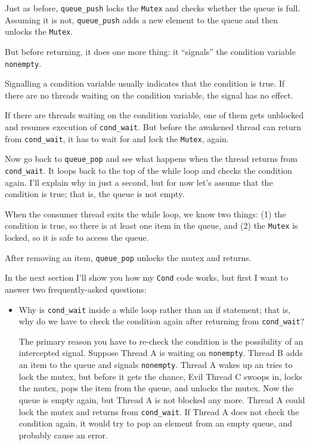 \documentclass[12pt]{book}
\begin{document}
{Just as before, \verb"queue_push" locks the {\tt Mutex} and checks
whether the queue is full.  Assuming it is not, \verb"queue_push" adds
a new element to the queue and then unlocks the {\tt Mutex}.

But before returning, it does one more thing: it ``signals'' the
condition variable {\tt nonempty}.

Signalling a condition variable usually indicates that the condition is
true.  If there are no threads waiting
on the condition variable, the signal has no effect.

If there are threads waiting on the condition variable, one of them
gets unblocked and resumes execution of \verb"cond_wait".  But before
the awakened thread can return from \verb"cond_wait", it has
to wait for and lock the {\tt Mutex}, again.

Now go back to \verb"queue_pop" and see what happens when the thread
returns from \verb"cond_wait".  It loops back to the top of the while
loop and checks the condition again.  I'll explain why in just a
second, but for now let's assume that the condition is true; that is,
the queue is not empty.

When the consumer thread exits the while loop, we know two things: (1)
the condition is true, so there is at least one item in the queue, and
(2) the {\tt Mutex} is locked, so it is safe to access the queue.

After removing an item, \verb"queue_pop" unlocks the mutex
and returns.

In the next section I'll show you how my {\tt Cond} code works, but first I
want to answer two frequently-asked questions:

\begin{itemize}

\item Why is \verb"cond_wait" inside a while loop rather than an if
statement; that is, why do we have to check the condition again after
returning from \verb"cond_wait"?

The primary reason you have to re-check the condition is the possibility
of an intercepted signal.  Suppose Thread A is waiting on {\tt nonempty}.
Thread B adds an item to the queue and signals {\tt nonempty}.  Thread
A wakes up an tries to lock the mutex, but before it gets the chance,
Evil Thread C swoops in, locks the mutex, pops the item from the
queue, and unlocks the mutex.  Now the queue is empty again, but
Thread A is not blocked any more.  Thread A could lock the mutex and
returns from \verb"cond_wait".  If Thread A does not check the condition
again, it would try to pop an element from an empty queue, and probably
cause an error.


\end{itemize}}
\end{document}
